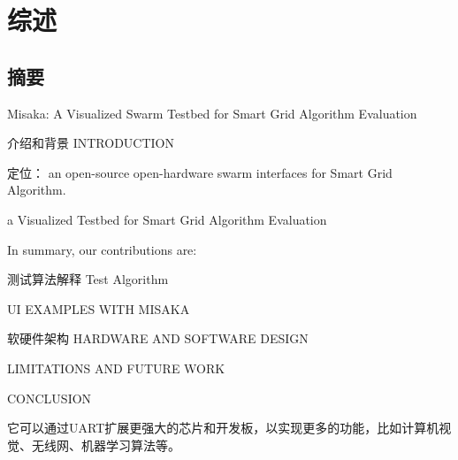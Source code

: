 \chapter{综述}
\label{cha:Overview}

\section{摘要}

Misaka: A Visualized Swarm Testbed for Smart Grid Algorithm Evaluation

介绍和背景 INTRODUCTION

定位： an open-source open-hardware swarm interfaces for Smart Grid Algorithm.

a Visualized Testbed for Smart Grid Algorithm Evaluation

In summary, our contributions are:


测试算法解释 Test Algorithm

UI EXAMPLES WITH MISAKA

软硬件架构 HARDWARE AND SOFTWARE DESIGN

LIMITATIONS AND FUTURE WORK

CONCLUSION

它可以通过UART扩展更强大的芯片和开发板，以实现更多的功能，比如计算机视觉、无线网、机器学习算法等。